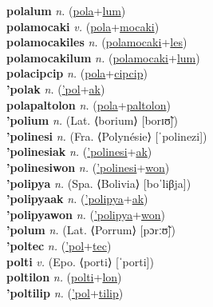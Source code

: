 \textbf{polalum} \textit{n.} (\hyperref[pola]{pola}+\hyperref[lum]{lum})
 \label{polalum} \\
\textbf{polamocaki} \textit{v.} (\hyperref[pola]{pola}+\hyperref[mocaki]{mocaki})
 \label{polamocaki} \\
\textbf{polamocakiles} \textit{n.} (\hyperref[polamocaki]{polamocaki}+\hyperref[les]{les})
 \label{polamocakiles} \\
\textbf{polamocakilum} \textit{n.} (\hyperref[polamocaki]{polamocaki}+\hyperref[lum]{lum})
 \label{polamocakilum} \\
\textbf{polacipcip} \textit{n.} (\hyperref[pola]{pola}+\hyperref[cipcip]{cipcip})
 \label{polacipcip} \\
\textbf{'polak} \textit{n.} (\hyperref['pol]{'pol}+\hyperref[ak]{ak})
 \label{'polak} \\
\textbf{polapaltolon} \textit{n.} (\hyperref[pola]{pola}+\hyperref[paltolon]{paltolon})
 \label{polapaltolon} \\
\textbf{'polium} \textit{n.} (Lat. ⟨borium⟩ [borɪʊ̃])
 \label{'polium} \\
\textbf{'polinesi} \textit{n.} (Fra. ⟨Polynésie⟩ [ˈpolinezi])
 \label{'polinesi} \\
\textbf{'polinesiak} \textit{n.} (\hyperref['polinesi]{'polinesi}+\hyperref[ak]{ak})
 \label{'polinesiak} \\
\textbf{'polinesiwon} \textit{n.} (\hyperref['polinesi]{'polinesi}+\hyperref[won]{won})
 \label{'polinesiwon} \\
\textbf{'polipya} \textit{n.} (Spa. ⟨Bolivia⟩ [boˈliβja])
 \label{'polipya} \\
\textbf{'polipyaak} \textit{n.} (\hyperref['polipya]{'polipya}+\hyperref[ak]{ak})
 \label{'polipyaak} \\
\textbf{'polipyawon} \textit{n.} (\hyperref['polipya]{'polipya}+\hyperref[won]{won})
 \label{'polipyawon} \\
\textbf{'polum} \textit{n.} (Lat. ⟨Porrum⟩ [pɔrːʊ̃])
 \label{'polum} \\
\textbf{'poltec} \textit{n.} (\hyperref['pol]{'pol}+\hyperref[tec]{tec})
 \label{'poltec} \\
\textbf{polti} \textit{v.} (Epo. ⟨porti⟩ [ˈporti])
 \label{polti} \\
\textbf{poltilon} \textit{n.} (\hyperref[polti]{polti}+\hyperref[lon]{lon})
 \label{poltilon} \\
\textbf{'poltilip} \textit{n.} (\hyperref['pol]{'pol}+\hyperref[tilip]{tilip})
 \label{'poltilip} \\
